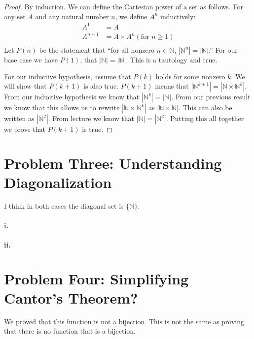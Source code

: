 \documentclass[10pt,letter]{article}
\begin{document}
\begin{proof} By induction. We can define the Cartesian power of a set as follows. For any set $A$ and any natural number $n$, we define $A^n$ inductively:
\begin{align*}
A^1 &= A \\
A^{n+1} &= A \times A^n (\text{for } n \ge 1)\\
\end{align*}
Let $P(n)$ be the statement that ``for all nonzero $n \in \mathbb{N}$, $|\mathbb{N}^n| = |\mathbb{N}|$.'' For our base case we have $P(1)$, that $|\mathbb{N}| = |\mathbb{N}|$. This is a tautology and true.

For our inductive hypothesis, assume that $P(k)$ holds for some nonzero $k$. We will show that $P(k+1)$ is also true. $P(k+1)$ means that $|\mathbb{N}^{k+1}| = |\mathbb{N} \times \mathbb{N}^k|$. From our inductive hypothesis we know that $|\mathbb{N}^k| = |\mathbb{N}|$. From our previous result we know that this allows us to rewrite $|\mathbb{N} \times \mathbb{N}^k|$ as $|\mathbb{N} \times \mathbb{N}|$. This can also be written as $|\mathbb{N}^2|$. From lecture we know that $|\mathbb{N}| = |\mathbb{N}^2|$. Putting this all together we prove that $P(k+1)$ is true.
\end{proof}

\section*{Problem Three: Understanding Diagonalization}
I think in both cases the diagonal set is $\{\mathbb{N}\}.$

\paragraph{i.} 
\paragraph{ii.}

\section*{Problem Four: Simplifying Cantor's Theorem?}
We proved that this function is not a bijection. This is not the same as proving that there is no function that is a bijection. 
\end{document}
